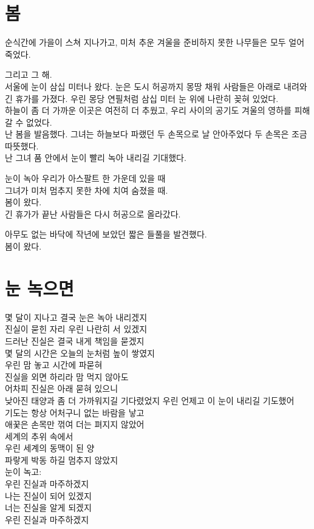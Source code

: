 \documentclass[12pt, b6paper, openany]{memoir}
\newenvironment{article}{}{}
\begin{document}
\begin{article}
\hypertarget{uxbd04}{%
\chapter{봄}\label{uxbd04}}

순식간에 가을이 스쳐 지나가고, 미처 추운 겨울을 준비하지 못한 나무들은 모두 얼어 죽었다.

그리고 그 해.\\
서울에 눈이 삼십 미터나 왔다. 눈은 도시 허공까지 몽땅 채워 사람들은 아래로 내려와 긴 휴가를 가졌다. 우린 몽당 연필처럼 삼십 미터 눈 위에 나란히 꽂혀 있었다.\\
하늘이 좀 더 가까운 이곳은 여전히 더 추웠고, 우리 사이의 공기도 겨울의 영하를 피해갈 수 없었다.\\
난 봄을 발음했다. 그녀는 하늘보다 파랬던 두 손목으로 날 안아주었다 두 손목은 조금 따뜻했다.\\
난 그녀 품 안에서 눈이 빨리 녹아 내리길 기대했다.

눈이 녹아 우리가 아스팔트 한 가운데 있을 때\\
그녀가 미처 멈추지 못한 차에 치여 숨졌을 때.\\
봄이 왔다.\\
긴 휴가가 끝난 사람들은 다시 허공으로 올라갔다.

아무도 없는 바닥에 작년에 보았던 짧은 들풀을 발견했다.\\
봄이 왔다.
\end{article}

\begin{article}
\hypertarget{uxb208-uxb179uxc73cuxba74}{%
\chapter{눈 녹으면}\label{uxb208-uxb179uxc73cuxba74}}

몇 달이 지나고 결국 눈은 녹아 내리겠지\\
진실이 묻힌 자리 우린 나란히 서 있겠지\\
드러난 진실은 결국 내게 책임을 묻겠지\\
몇 달의 시간은 오늘의 눈처럼 높이 쌓였지\\
우린 맘 놓고 시간에 파묻혀\\
진실을 외면 하리라 맘 먹지 않아도\\
어차피 진실은 아래 묻혀 있으니\\
낮아진 태양과 좀 더 가까워지길 기다렸었지 우린 언제고 이 눈이 내리길 기도했어\\
기도는 항상 어처구니 없는 바람을 낳고\\
애꿎은 손목만 꺾여 더는 펴지지 않았어\\
세계의 추위 속에서\\
우린 세계의 동맥이 된 양\\
파랗게 박동 하길 멈추지 않았지\\
눈이 녹고:\\
우린 진실과 마주하겠지\\
나는 진실이 되어 있겠지\\
너는 진실을 알게 되겠지\\
우린 진실과 마주하겠지
\end{article}
\end{document}
